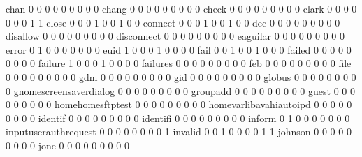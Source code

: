 \documentclass[compress,8pt]{beamer}
\begin{document}
\begin{frame}
\begin{Schunk}
  chan                                       0   0   0   0   0   0   0   0   0
  chang                                      0   0   0   0   0   0   0   0   0
  check                                      0   0   0   0   0   0   0   0   0
  clark                                      0   0   0   0   0   0   0   1   1
  close                                      0   0   0   1   0   0   1   0   0
  connect                                    0   0   0   1   0   0   1   0   0
  dec                                        0   0   0   0   0   0   0   0   0
  disallow                                   0   0   0   0   0   0   0   0   0
  disconnect                                 0   0   0   0   0   0   0   0   0
  eaguilar                                   0   0   0   0   0   0   0   0   0
  error                                      0   1   0   0   0   0   0   0   0
  euid                                       1   0   0   0   1   0   0   0   0
  fail                                       0   0   1   0   0   1   0   0   0
  failed                                     0   0   0   0   0   0   0   0   0
  failure                                    1   0   0   0   1   0   0   0   0
  failures                                   0   0   0   0   0   0   0   0   0
  feb                                        0   0   0   0   0   0   0   0   0
  file                                       0   0   0   0   0   0   0   0   0
  gdm                                        0   0   0   0   0   0   0   0   0
  gid                                        0   0   0   0   0   0   0   0   0
  globus                                     0   0   0   0   0   0   0   0   0
  gnomescreensaverdialog                     0   0   0   0   0   0   0   0   0
  groupadd                                   0   0   0   0   0   0   0   0   0
  guest                                      0   0   0   0   0   0   0   0   0
  homehomesftptest                           0   0   0   0   0   0   0   0   0
  homevarlibavahiautoipd                     0   0   0   0   0   0   0   0   0
  identif                                    0   0   0   0   0   0   0   0   0
  identifi                                   0   0   0   0   0   0   0   0   0
  inform                                     0   1   0   0   0   0   0   0   0
  inputuserauthrequest                       0   0   0   0   0   0   0   0   1
  invalid                                    0   0   1   0   0   0   0   1   1
  johnson                                    0   0   0   0   0   0   0   0   0
  jone                                       0   0   0   0   0   0   0   0   0

\end{Schunk}
\end{frame}
\end{document}
